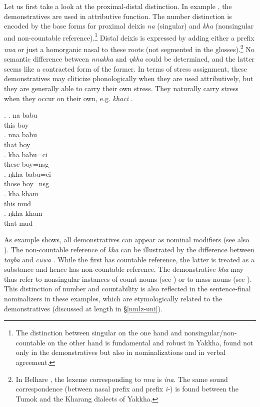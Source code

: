Let us first take a look at the proximal-distal distinction.  In example \Next, the demonstratives are used in attributive function. The number distinction is encoded by the base forms for proximal deixis \emph{na} (singular) and \emph{kha} (nonsingular and non-countable reference).\footnote{The distinction between singular on the one hand and nonsingular/non-countable on the other hand is fundamental and robust in Yakkha, found not only in the  demonstratives but also in nominalizations and in verbal agreement.}  Distal deixis is expressed by adding either a prefix \emph{nna} or just a homorganic nasal to these roots (not segmented in the glosses).\footnote{In Belhare \citep[548]{Bickel2003Belhare}, the lexeme corresponding to \emph{nna} is \emph{ina}. The same sound correspondence (between nasal prefix and prefix \emph{i-}) is found between the Tumok and  the Kharang dialects of Yakkha.} No semantic difference between \emph{nnakha} and \emph{ŋkha} could be determined, and the latter seems like a contracted form of the former. In terms of stress assignment, these demonstratives may cliticize phonologically when they are used attributively, but they are generally able to carry their own stress. They naturally  carry stress when they occur on their own, e.g. \emph{khaci} .

\ex. \ag. na babu \\
	this boy\\
	\bg. nna babu \\
		that boy\\
	\bg. kha babu=ci\\
		these boy{\sc =nsg}\\
	\bg. ŋkha babu=ci\\
		those boy{\sc =nsg}\\
		\bg. kha kham\\
		this mud\\
	\bg. ŋkha kham\\
		that mud\\

As example \Last shows, all demonstratives can appear as nominal modifiers (see also \Next). The non-countable reference of \emph{kha} can be illustrated by the difference between \emph{toŋba}  and \emph{cuwa} . While the first has countable reference, the latter is treated as a substance and hence has non-countable reference. The demonstrative \emph{kha} may thus refer to nonsingular instances of count nouns (see \Next[b]) or to mass nouns  (see \Next[c]). This distinction of number and countability is also reflected in the sentence-final nominalizers in these examples, which are etymologically related to the demonstratives (discussed at length in §\ref{nmlz-uni}).

